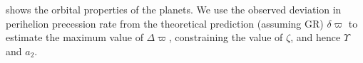  shows the orbital properties of the planets. We use the observed deviation in perihelion precession rate from the theoretical prediction (assuming GR) $\delta \varpi$ to estimate the maximum value of $\Delta\varpi$, constraining the value of $\zeta$, and hence $\Upsilon$ and $a_2$.

